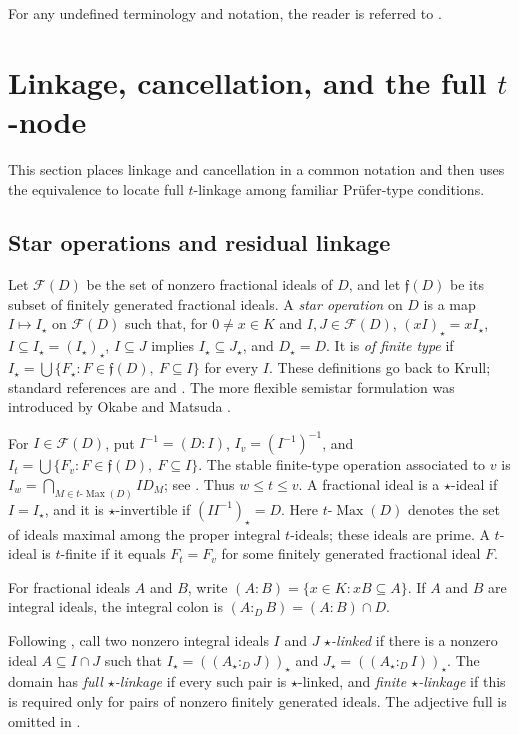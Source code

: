\documentclass[11pt]{amsart}
\theoremstyle{definition}
\theoremstyle{remark}
\newcommand{\Fcal}{\mathcal F}
\newcommand{\fcal}{\mathfrak f}
\newcommand{\tMax}{t\text{-}\operatorname{Max}}
\begin{document}
For any undefined terminology and notation, the reader is referred to \cite{WK24}.

\section{Linkage, cancellation, and the full \texorpdfstring{$t$}{t}-node}
\label{sec:linkage}

This section places linkage and cancellation in a common notation and then
uses the equivalence to locate full $t$-linkage among familiar
Pr\"ufer-type conditions.

\subsection{Star operations and residual linkage}

Let $\Fcal(D)$ be the set of nonzero fractional ideals of $D$, and let
$\fcal(D)$ be its subset of finitely generated fractional ideals.  A
\emph{star operation} on $D$ is a map $I\mapsto I_\star$ on $\Fcal(D)$ such
that, for $0\ne x\in K$ and $I,J\in\Fcal(D)$,
$(xI)_\star=xI_\star$, $I\subseteq I_\star=(I_\star)_\star$,
$I\subseteq J$ implies $I_\star\subseteq J_\star$, and $D_\star=D$.  It is
\emph{of finite type} if
$I_\star=\bigcup\{F_\star:F\in\fcal(D),\ F\subseteq I\}$ for every $I$.
These definitions go back to Krull; standard references are
\cite[Section~32]{GilmerBook} and \cite{HalterKoch}.  The more flexible
semistar formulation was introduced by Okabe and Matsuda
\cite{OkabeMatsuda}.

For $I\in\Fcal(D)$, put $I^{-1}=(D:I)$,
$I_v=(I^{-1})^{-1}$, and
$I_t=\bigcup\{F_v:F\in\fcal(D),\ F\subseteq I\}$.  The stable finite-type
operation associated to $v$ is
$I_w=\bigcap_{M\in\tMax(D)}ID_M$; see
\cite{FontanaHuckabaPapick, WangMcCasland}.  Thus $w\leq t\leq v$.  A
fractional ideal is a $\star$-ideal if $I=I_\star$, and it is
$\star$-invertible if $(II^{-1})_\star=D$.  Here $\tMax(D)$ denotes the
set of ideals maximal among the proper integral $t$-ideals; these ideals
are prime.  A $t$-ideal is $t$-finite if it equals $F_t=F_v$ for some
finitely generated fractional ideal $F$.

For fractional ideals $A$ and $B$, write
$(A:B)=\{x\in K:xB\subseteq A\}$.  If $A$ and $B$ are integral ideals, the
integral colon is $(A:_D B)=(A:B)\cap D$.

Following \cite[Definition~2.1]{KabbajMimouniStar}, call two nonzero
integral ideals $I$ and $J$ \emph{$\star$-linked} if there is a nonzero
ideal $A\subseteq I\cap J$ such that
$I_\star=((A_\star:_D J))_\star$ and
$J_\star=((A_\star:_D I))_\star$.  The domain has
\emph{full $\star$-linkage} if every such pair is $\star$-linked, and
\emph{finite $\star$-linkage} if this is required only for pairs of
nonzero finitely generated ideals.  The adjective full is omitted in
\cite{KabbajMimouniStar}.
\end{document}
